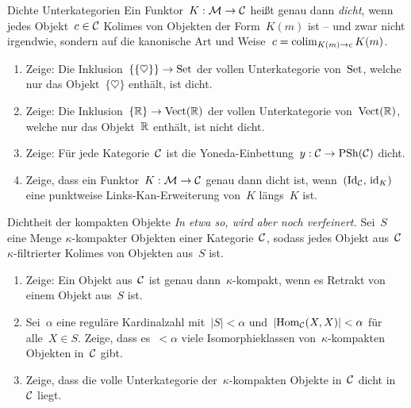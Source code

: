 \documentclass{uebblatt}
\begin{document}

\begin{aufgabe}{Dichte Unterkategorien}
Ein Funktor~$K : \mathcal{M} \to \mathcal{C}$ heißt genau dann \emph{dicht}, wenn jedes Objekt~$c
\in \mathcal{C}$ Kolimes von Objekten der Form~$K(m)$ ist -- und zwar nicht irgendwie,
sondern auf die kanonische Art und Weise~$c = \operatorname*{colim}_{K(m) \to c} K(m)$.
\begin{enumerate}
\item Zeige: Die Inklusion~$\{\{\heartsuit\}\} \to \mathrm{Set}$ der vollen
Unterkategorie von~$\mathrm{Set}$, welche nur das Objekt~$\{\heartsuit\}$ enthält, ist
dicht.
\item Zeige: Die Inklusion~$\{\mathbb{R}\} \to \mathrm{Vect}(\mathbb{R})$ der vollen
Unterkategorie von~$\mathrm{Vect}(\mathbb{R})$, welche nur das Objekt~$\mathbb{R}$ enthält, ist
nicht dicht.
\item Zeige: Für jede Kategorie~$\mathcal{C}$ ist die Yoneda-Einbettung~$y : \mathcal{C} \to
\mathrm{PSh}(\mathcal{C})$ dicht.
\item Zeige, dass ein Funktor~$K : \mathcal{M} \to \mathcal{C}$ genau dann dicht ist,
wenn~$(\mathrm{Id}_{\mathcal{C}},\,\mathrm{id}_K)$ eine punktweise Links-Kan-Erweiterung von~$K$
längs~$K$ ist.
\end{enumerate}
\end{aufgabe}

\begin{aufgabe}{Dichtheit der kompakten Objekte}
\emph{In etwa so, wird aber noch verfeinert.}
Sei~$S$ eine Menge $\kappa$-kompakter Objekten einer Kategorie~$\mathcal{C}$, 
sodass jedes Objekt aus~$\mathcal{C}$ $\kappa$-filtrierter Kolimes von Objekten aus~$S$
ist.
\begin{enumerate}
\item Zeige: Ein Objekt aus~$\mathcal{C}$ ist genau dann~$\kappa$-kompakt, wenn es
Retrakt von einem Objekt aus~$S$ ist.
\item Sei~$\alpha$ eine reguläre Kardinalzahl mit~$|S| < \alpha$
und~$|\mathrm{Hom}_{\mathcal{C}}(X,X)| < \alpha$ für alle~$X \in S$. Zeige, dass es~$< \alpha$
viele Isomorphieklassen von~$\kappa$-kompakten Objekten in~$\mathcal{C}$
gibt.
\item Zeige, dass die volle Unterkategorie der~$\kappa$-kompakten Objekte in~$\mathcal{C}$ dicht
in~$\mathcal{C}$ liegt.
\end{enumerate}
%
\end{aufgabe}
\end{document}
